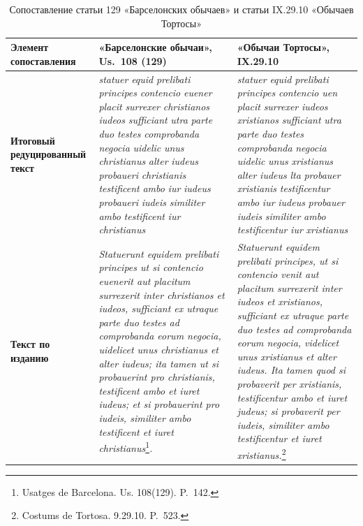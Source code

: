 \begin{center}
\small
\setlength{\tabcolsep}{2pt}
\begin{longtable}{|p{}|p{}|p{}|}
\caption{Сопоставление статьи 129 «Барселонских обычаев» и статьи IX.29.10 «Обычаев Тортосы»}\label{tab:ch1-tortosa-129}\\
\hline
\textbf{Элемент сопоставления} & \textbf{«Барселонские обычаи», }\textbf{Us}\textbf{.}\textbf{~108 (}\textbf{129}\textbf{)} & \textbf{«Обычаи Тортосы», IX.29.10} \\ \hline
\textbf{Итоговый редуцированный текст} & \emph{statuer}\emph{ }\emph{equid}\emph{ }\emph{prelibati}\emph{ }\emph{principes}\emph{ }\emph{contencio}\emph{ }\emph{euener}\emph{ }\emph{placit}\emph{ }\emph{surrexer}\emph{ }\emph{christianos}\emph{ }\emph{iudeos}\emph{ }\emph{sufficiant}\emph{ }\emph{utra}\emph{ }\emph{parte}\emph{ }\emph{duo}\emph{ }\emph{testes}\emph{ }\emph{comprobanda}\emph{ }\emph{negocia}\emph{ }\emph{uidelic}\emph{ }\emph{unus}\emph{ }\emph{christianus}\emph{ }\emph{alter}\emph{ }\emph{iudeus}\emph{ }\emph{probaueri}\emph{ }\emph{christianis}\emph{ }\emph{testificent}\emph{ }\emph{ambo}\emph{ }\emph{iur}\emph{ }\emph{iudeus}\emph{ }\emph{probaueri}\emph{ }\emph{iudeis}\emph{ }\emph{similiter}\emph{ }\emph{ambo}\emph{ }\emph{testificent}\emph{ }\emph{iur}\emph{ }\emph{christianus} & \emph{statuer}\emph{ }\emph{equid}\emph{ }\emph{prelibati}\emph{ }\emph{principes}\emph{ }\emph{contencio}\emph{ }\emph{uen}\emph{ }\emph{placit}\emph{ }\emph{surrexer}\emph{ }\emph{iudeos}\emph{ }\emph{xristianos}\emph{ }\emph{sufficiant}\emph{ }\emph{utra}\emph{ }\emph{parte}\emph{ }\emph{duo}\emph{ }\emph{testes}\emph{ }\emph{comprobanda}\emph{ }\emph{negocia}\emph{ }\emph{uidelic}\emph{ }\emph{unus}\emph{ }\emph{xristianus}\emph{ }\emph{alter}\emph{ }\emph{iudeus}\emph{ }\emph{lta}\emph{ }\emph{probauer}\emph{ }\emph{xristianis}\emph{ }\emph{testificentur}\emph{ }\emph{ambo}\emph{ }\emph{iur}\emph{ }\emph{iudeus}\emph{ }\emph{probauer}\emph{ }\emph{iudeis}\emph{ }\emph{similiter}\emph{ }\emph{ambo}\emph{ }\emph{testificentur}\emph{ }\emph{iur}\emph{ }\emph{xristianus} \\ \hline
\textbf{Текст по изданию} & \emph{Statuerunt equidem prelibati principes ut si contencio euenerit aut placitum surrexerit inter christianos et iudeos, sufficiant ex utraque parte duo testes ad comprobanda eorum negocia, uidelicet unus christianus et alter iudeus; ita tamen ut si probauerint pro christianis, testificent ambo et iuret iudeus; et si probauerint pro iudeis, similiter ambo testificent et iuret christianus}\footnote{Usatges de Barcelona. Us. 108(129). P.~142.}\emph{.} & \emph{Statuerunt equidem prelibati principes, ut si contencio venit aut placitum surrexerit inter iudeos et xristianos, sufficiant ex utraque parte duo testes ad comprobanda eorum negocia, videlicet unus xristianus et alter iudeus. Ita tamen quod si probaverit per xristianis, testificentur ambo et iuret judeus; si probaverit per iudeis, similiter ambo testificentur et iuret xristianus.}\footnote{Costums de Tortosa. 9.29.10. P.~523.} \\ \hline

\end{longtable}
\end{center}
